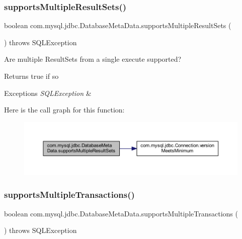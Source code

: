 \subsubsection{\texorpdfstring{supports\+Multiple\+Result\+Sets()}{supportsMultipleResultSets()}}
{\footnotesize\ttfamily boolean com.\+mysql.\+jdbc.\+Database\+Meta\+Data.\+supports\+Multiple\+Result\+Sets (\begin{DoxyParamCaption}{ }\end{DoxyParamCaption}) throws S\+Q\+L\+Exception}

Are multiple Result\+Sets from a single execute supported?

\begin{DoxyReturn}{Returns}
true if so 
\end{DoxyReturn}

\begin{DoxyExceptions}{Exceptions}
{\em S\+Q\+L\+Exception} & \\
\hline
\end{DoxyExceptions}
Here is the call graph for this function\+:
\nopagebreak
\begin{figure}[H]
\begin{center}
\leavevmode
\includegraphics[width=350pt]{classcom_1_1mysql_1_1jdbc_1_1_database_meta_data_a872d95569ec1e763e18a9378f517db42_cgraph}
\end{center}
\end{figure}
\mbox{\label{classcom_1_1mysql_1_1jdbc_1_1_database_meta_data_a91ea567250dde12e511a5716d5ef8185}} 
\subsubsection{\texorpdfstring{supports\+Multiple\+Transactions()}{supportsMultipleTransactions()}}
{\footnotesize\ttfamily boolean com.\+mysql.\+jdbc.\+Database\+Meta\+Data.\+supports\+Multiple\+Transactions (\begin{DoxyParamCaption}{ }\end{DoxyParamCaption}) throws S\+Q\+L\+Exception}

